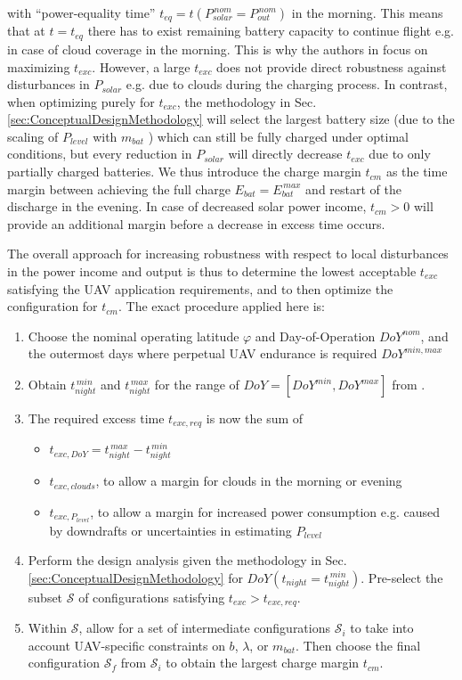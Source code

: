 with ``power-equality time'' $t_{eq}=t(P_{solar}^{\,nom}=P_{out}^{\,nom})$ in the morning. This means that at $t=t_{eq}$ there has to exist remaining battery capacity to continue flight e.g. in case of cloud coverage in the morning. This is why the authors in \cite{Noth_PhD,Leutenegger_JIRS} focus on maximizing $t_{exc}$. However, a large $t_{exc}$ does not provide direct robustness against disturbances in $P_{solar}$ e.g. due to clouds during the charging process. In contrast, when optimizing purely for $t_{exc}$, the methodology in Sec. \ref{sec:ConceptualDesignMethodology} will select the largest battery size (due to the scaling of $P_{level}$ with $m_{bat}$ ) which can still be fully charged under optimal conditions, but every reduction in $P_{solar}$ will directly decrease $t_{exc}$ due to only partially charged batteries. We thus introduce the charge margin $t_{cm}$ as the time margin between achieving the full charge $E_{bat}=E_{bat}^{\,max}$ and restart of the discharge in the evening. In case of decreased solar power income, $t_{cm}>0$ will provide an additional margin before a decrease in excess time occurs.

The overall approach for increasing robustness with respect to local disturbances in the power income and output is thus to determine the lowest acceptable $t_{exc}$ satisfying the UAV application requirements, and to then optimize the configuration for $t_{cm}$. The exact procedure applied here is:
\begin{enumerate}
\item Choose the nominal operating latitude $\varphi$ and Day-of-Operation $DoY^{nom}$, and the outermost days where perpetual UAV endurance is required $DoY^{min,max}$
\item Obtain $t_{night}^{\,min}$ and $t_{night}^{\,max}$ for the range of $DoY=[DoY^{min},DoY^{max}]$ from \cite{Duffie_SolarEngineering}. 
\item The required excess time $t_{exc,req}$ is now the sum of 
\begin{itemize}
	\item $t_{exc,DoY} = t_{night}^{\,max}-t_{night}^{\,min}$
	\item $t_{exc,clouds}$, to allow a margin for clouds in the morning or evening
	\item $t_{exc,P_{level}}$, to allow a margin for increased power consumption e.g. caused by downdrafts or uncertainties in estimating $P_{level}$
\end{itemize}
\item Perform the design analysis given the methodology in Sec. \ref{sec:ConceptualDesignMethodology} for $DoY(t_{night}=t_{night}^{\,min})$. Pre-select the subset $\mathcal{S}$ of configurations satisfying $t_{exc}>t_{exc,req}$.
\item Within $\mathcal{S}$, allow for a set of intermediate configurations $\mathcal{S}_i$ to take into account UAV-specific constraints on $b$, $\lambda$, or $m_{bat}$. Then choose the final configuration $\mathcal{S}_f$  from $\mathcal{S}_i$ to obtain the largest charge margin $t_{cm}$.
\end{enumerate}

